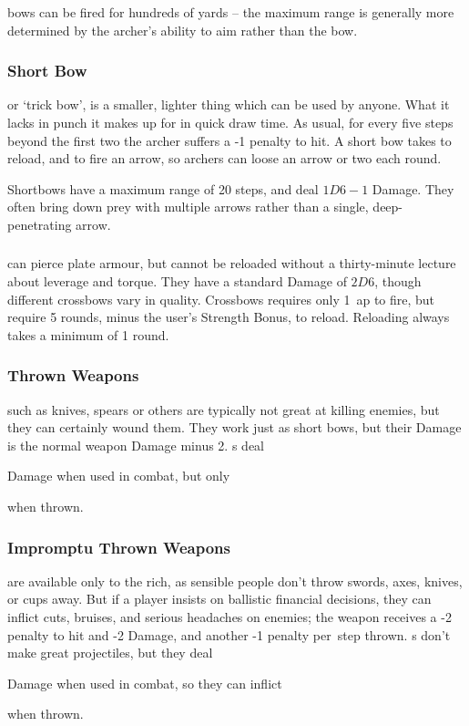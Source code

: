 \begin{multicols}{2}
\Glspl{bow} can be fired for hundreds of yards -- the maximum range is generally more determined by the archer's ability to aim rather than the bow.

\subsubsection{Short Bow}
or `trick bow', is a smaller, lighter thing which can be used by anyone.
What it lacks in punch it makes up for in quick draw time.
As usual, for every five steps beyond the first two the archer suffers a -1 penalty to hit.
A short bow takes  to reload, and  to fire an arrow, so archers can loose an arrow or two each round.

Shortbows have a maximum range of 20 steps, and deal $1D6-1$ Damage.
They often bring down prey with multiple arrows rather than a single, deep-penetrating arrow.

\subsubsection{}
\label{crossbow}
can pierce plate armour, but cannot be reloaded without a thirty-minute lecture about leverage and torque.
They have a standard Damage of $2D6$, though different crossbows vary in quality.
Crossbows requires only 1~\gls{ap} to fire, but require 5 \glspl{round}, minus the user's Strength Bonus, to reload.
Reloading always takes a minimum of 1 \gls{round}.

\subsubsection{Thrown Weapons}
such as knives, spears or others are typically not great at killing enemies, but they can certainly wound them.
They work just as short bows, but their Damage is the normal weapon Damage minus 2.
\javelin\weaponName s deal
\addtocounter{weaponDamage}{4}
 Damage
when used in combat, but only
\addtocounter{weaponDamage}{-2}%
 when thrown.

\subsubsection{Impromptu Thrown Weapons}
are available only to the rich, as sensible people don't throw swords, axes, knives, or cups away.
But if a player insists on ballistic financial decisions, they can inflict cuts, bruises, and serious headaches on enemies; the weapon receives a -2 penalty to hit and -2 Damage, and another -1 penalty per~\gls{step} thrown.
\longsword\weaponName s don't make great projectiles, but they deal
\addtocounter{weaponDamage}{4}
 Damage
when used in combat, so they can inflict
\addtocounter{weaponDamage}{-2}%
 when thrown.

\end{multicols}

